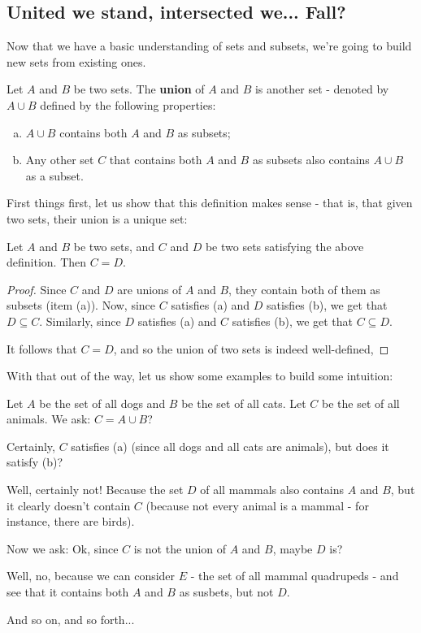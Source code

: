 \subsection{United we stand, intersected we... Fall?}

Now that we have a basic understanding of sets and subsets, we're going to build new sets from existing ones.

\begin{df}
	Let $A$ and $B$ be two sets. The \textbf{union} of $A$ and $B$ is another set - denoted by $A\cup B$ defined by the following properties:
	\begin{enumerate}[(a)]
		\item $A\cup B$ contains both $A$ and $B$ as subsets;
		\item Any other set $C$ that contains both $A$ and $B$ as subsets also contains $A\cup B$ as a subset.
	\end{enumerate}
\end{df}

First things first, let us show that this definition makes sense - that is, that given two sets, their union is a unique set:

\begin{lemma}
	Let $A$ and $B$ be two sets, and $C$ and $D$ be two sets satisfying the above definition. Then $C=D$.
\end{lemma}
\begin{proof}
	Since $C$ and $D$ are unions of $A$ and $B$, they contain both of them as subsets (item (a)). Now, since $C$ satisfies (a) and $D$ satisfies (b), we get that $D\subseteq C$. Similarly, since $D$ satisfies (a) and $C$ satisfies (b), we get that $C\subseteq D$.
	
	It follows that $C=D$, and so the union of two sets is indeed well-defined,
\end{proof}

With that out of the way, let us show some examples to build some intuition:

\begin{ex}
	Let $A$ be the set of all dogs and $B$ be the set of all cats. Let $C$ be the set of all animals. We ask: $C=A\cup B$?
	
	Certainly, $C$ satisfies (a) (since all dogs and all cats are animals), but does it satisfy (b)?
	
	Well, certainly not! Because the set $D$ of all mammals also contains $A$ and $B$, but it clearly doesn't contain $C$ (because not every animal is a mammal - for instance, there are birds).
	
	Now we ask: Ok, since $C$ is not the union of $A$ and $B$, maybe $D$ is?
	
	Well, no, because we can consider $E$ - the set of all mammal quadrupeds  - and see that it contains both $A$ and $B$ as susbets, but not $D$.
	
	And so on, and so forth...
\end{ex}

